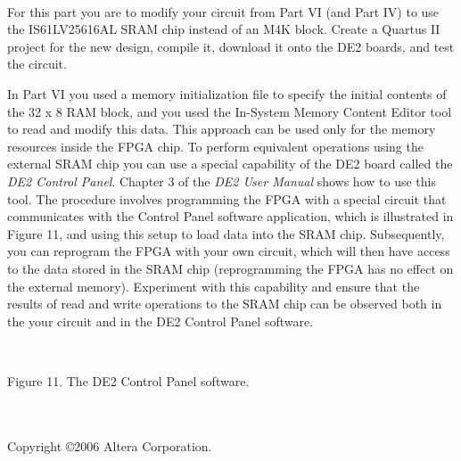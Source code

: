 \documentclass[psfig,10pt,fullpage]{article}
\begin{document}
~\\

For this part you are to modify your circuit from Part VI (and Part IV) to use the 
IS61LV25616AL SRAM chip instead of an M4K block. Create a Quartus II project for the new
design, compile it, download it onto the DE2 boards, and test the circuit.

In Part VI you used a memory initialization file to specify the initial contents of 
the 32 {\sf x} 8 RAM block, and you used the In-System Memory Content Editor tool to read and
modify this data. This approach can be used only for the memory resources inside the FPGA
chip. To perform equivalent operations using the external SRAM chip you can use a special
capability of the DE2 board called the {\it DE2 Control Panel}. Chapter 3 of the {\it DE2 User
Manual} shows how to use this tool. The procedure involves programming the FPGA with a
special circuit that communicates with the Control Panel software application, which is
illustrated in Figure 11, and using this setup to load data into the SRAM chip.
Subsequently, you can reprogram the FPGA with your own circuit, which will then 
have access to the data stored in
the SRAM chip (reprogramming the FPGA has no effect on the external memory).
Experiment with this capability and ensure that the results of read and write
operations to the SRAM chip can be observed both in the your circuit and in the DE2
Control Panel software.

~\\
\begin{figure}[H]
\scriptsize
\centerline{
\hbox{}}
\end{figure}
\centerline{Figure 11.  The DE2 Control Panel software.}

~\\
~\\
Copyright \copyright 2006 Altera Corporation. 
\end{document}
